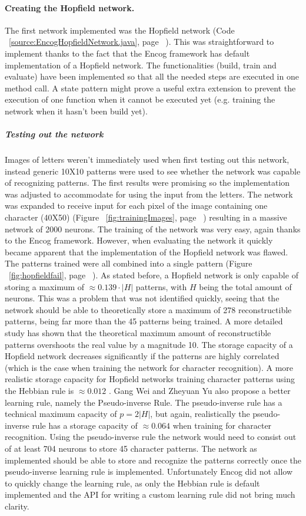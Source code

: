 \documentclass[pdftex,a4paper,12pt,twoside]{report}
\theoremstyle{plain} \newtheorem{theorem}{Theorem} \newtheorem{proposition}{Proposition} \newtheorem{lemma}{Lemma} \newtheorem*{corollary}{Corollary}
\theoremstyle{definition} \newtheorem{definition}{Definition} \newtheorem{conjecture}{Conjecture} \newtheorem*{example}{Example} \newtheorem{algorithm}{Algorithm}
\theoremstyle{remark} \newtheorem*{remark}{Remark} \newtheorem*{note}{Note} \newtheorem{case}{Case}
\begin{document}
\paragraph{Creating the Hopfield network.}
The first network implemented was the Hopfield network (Code ~\ref{source:EncogHopfieldNetwork.java}, page ~\pageref{source:EncogHopfieldNetwork.java}). This was straightforward to implement thanks to the fact that the Encog framework has default implementation of a Hopfield network. The functionalities (build, train and evaluate) have been implemented so that all the needed steps are executed in one method call. A state pattern might prove a useful extra extension to prevent the execution of one function when it cannot be executed yet (e.g. training the network when it hasn't been build yet).
\subparagraph{Testing out the network}
Images of letters weren't immediately used when first testing out this network, instead generic 10X10 patterns were used to see whether the network was capable of recognizing patterns. The first results were promising so the implementation was adjusted to accommodate for using the input from the letters. The network was expanded to receive input for each pixel of the image containing one character (40X50) (Figure ~\ref{fig:trainingImages}, page ~\pageref{fig:trainingImages}) resulting in a massive network of 2000 neurons. The training of the network was very easy, again thanks to the Encog framework. However, when evaluating the network it quickly became apparent that the implementation of the Hopfield network was flawed. The patterns trained were all combined into a single pattern (Figure ~\ref{fig:hopfieldfail}, page ~\pageref{fig:hopfieldfail}). As stated before, a Hopfield network is only capable of storing a maximum of $\approx  0.139 \cdot |H|$ patterns, with $H$ being the total amount of neurons. This was a problem that was not identified quickly, seeing that the network should be able to theoretically store a maximum of 278 reconstructible patterns, being far more than the 45 patterns being trained. A more detailed study has shown that the theoretical maximum amount of reconstructible patterns overshoots the real value by a magnitude 10. The storage capacity of a Hopfield network decreases significantly if the patterns are highly correlated (which is the case when training the network for character recognition). A more realistic storage capacity for Hopfield networks training character patterns using the Hebbian rule is $\approx 0.012$ \citep{Gang}. Gang Wei and Zheyuan Yu also propose a better learning rule, namely the Pseudo-inverse Rule. The pseudo-inverse rule has a technical maximum capacity of $p = 2|H|$, but again, realistically the pseudo-inverse rule has a storage capacity of $\approx 0.064$ when training for character recognition. Using the pseudo-inverse rule the network would need to consist out of at least 704 neurons to store 45 character patterns. The network as implemented should be able to store and recognize the patterns correctly once the pseudo-inverse learning rule is implemented. Unfortunately Encog did not allow to quickly change the learning rule, as only the Hebbian rule is default implemented and the API for writing a custom learning rule did not bring much clarity.
\end{document}

